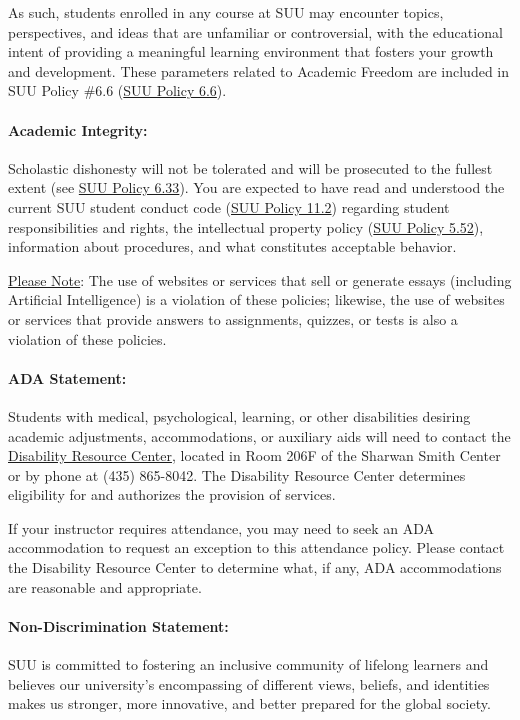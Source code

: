 \documentclass[12pt, letterpaper]{article}
\begin{document}
\noindent As such, students enrolled in any course at SUU may encounter topics, perspectives, and ideas that are unfamiliar or controversial, with the educational intent of providing a meaningful learning environment that fosters your growth and development. These parameters related to Academic Freedom are included in SUU Policy \#6.6 (\href{https://www.suu.edu/policies/06/06.html}{SUU Policy 6.6}).


\paragraph{Academic Integrity:}
Scholastic dishonesty will not be tolerated and will be prosecuted to the fullest extent (see \href{https://www.suu.edu/policies/06/33.html}{SUU Policy 6.33}). You are expected to have read and understood the current SUU student conduct code (\href{https://www.suu.edu/policies/11/02.html}{SUU Policy 11.2}) regarding student responsibilities and rights, the intellectual property policy (\href{https://www.suu.edu/policies/05/52.html}{SUU Policy 5.52}), information about procedures, and what constitutes acceptable behavior.

\noindent
\underline{Please Note}: The use of websites or services that sell or generate essays (including Artificial Intelligence) is a violation of these policies; likewise, the use of websites or services that provide answers to assignments, quizzes, or tests is also a violation of these policies.

\paragraph{ADA Statement:}
Students with medical, psychological, learning, or other disabilities desiring academic adjustments, accommodations, or auxiliary aids will need to contact the \href{https://www.suu.edu/disabilityservices/}{Disability Resource Center}, located in Room 206F of the Sharwan Smith Center or by phone at (435) 865-8042. The Disability Resource Center determines eligibility for and authorizes the provision of services.

\noindent
If your instructor requires attendance, you may need to seek an ADA accommodation to request an exception to this attendance policy. Please contact the Disability Resource Center to determine what, if any, ADA accommodations are reasonable and appropriate.


\paragraph{Non-Discrimination Statement:}
SUU is committed to fostering an inclusive community of lifelong learners and believes our university's encompassing of different views, beliefs, and identities makes us stronger, more innovative, and better prepared for the global society. 
\end{document}
